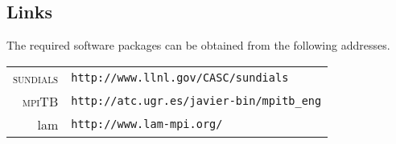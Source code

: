 \documentclass[titlepage,10pt]{article}
\newcommand{\sundials}{{\normalfont\scshape sundials}}
\newcommand{\mpiTB}{{\normalfont\scshape mpiTB}}
\begin{document}
\subsection{Links} 

The required software packages can be obtained from the following addresses.

\begin{tabular}{rl}
{\sundials} & {\tt http://www.llnl.gov/CASC/sundials} \\
{\mpiTB}    & {\tt http://atc.ugr.es/javier-bin/mpitb\_eng}\\
{\sc lam}   & {\tt http://www.lam-mpi.org/}
\end{tabular}
\end{document}
